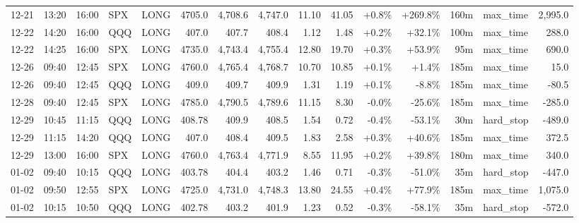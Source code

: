 \documentclass[11pt,a4paper,twoside]{article}
\begin{document}
\begin{landscape}
\begin{center}
\begin{longtable}{>{\color{txtmain}}l l l l l r r r r r r r r >{\color{txtmain}}l r}
12-21 & 13:20 & 16:00 & SPX & LONG & 4705.0 & 4,708.6 & 4,747.0 & 11.10 & 41.05 & \textcolor{wingreen}{+0.8\%} & \textcolor{wingreen}{+269.8\%} & 160m & max\_time & \textcolor{wingreen}{2,995.0} \\
12-22 & 14:20 & 16:00 & QQQ & LONG & 407.0 & 407.7 & 408.4 & 1.12 & 1.48 & \textcolor{wingreen}{+0.2\%} & \textcolor{wingreen}{+32.1\%} & 100m & max\_time & \textcolor{wingreen}{288.0} \\
12-22 & 14:25 & 16:00 & SPX & LONG & 4735.0 & 4,743.4 & 4,755.4 & 12.80 & 19.70 & \textcolor{wingreen}{+0.3\%} & \textcolor{wingreen}{+53.9\%} & 95m & max\_time & \textcolor{wingreen}{690.0} \\
12-26 & 09:40 & 12:45 & SPX & LONG & 4760.0 & 4,765.4 & 4,768.7 & 10.70 & 10.85 & \textcolor{wingreen}{+0.1\%} & \textcolor{wingreen}{+1.4\%} & 185m & max\_time & \textcolor{wingreen}{15.0} \\
12-26 & 09:40 & 12:45 & QQQ & LONG & 409.0 & 409.7 & 409.9 & 1.31 & 1.19 & \textcolor{wingreen}{+0.1\%} & \textcolor{lossred}{-8.8\%} & 185m & max\_time & \textcolor{lossred}{-80.5} \\
12-28 & 09:40 & 12:45 & SPX & LONG & 4785.0 & 4,790.5 & 4,789.6 & 11.15 & 8.30 & \textcolor{lossred}{-0.0\%} & \textcolor{lossred}{-25.6\%} & 185m & max\_time & \textcolor{lossred}{-285.0} \\
12-29 & 10:45 & 11:15 & QQQ & LONG & 408.78 & 409.9 & 408.5 & 1.54 & 0.72 & \textcolor{lossred}{-0.4\%} & \textcolor{lossred}{-53.1\%} & 30m & hard\_stop & \textcolor{lossred}{-489.0} \\
12-29 & 11:15 & 14:20 & QQQ & LONG & 407.0 & 408.4 & 409.5 & 1.83 & 2.58 & \textcolor{wingreen}{+0.3\%} & \textcolor{wingreen}{+40.6\%} & 185m & max\_time & \textcolor{wingreen}{372.5} \\
12-29 & 13:00 & 16:00 & SPX & LONG & 4760.0 & 4,763.4 & 4,771.9 & 8.55 & 11.95 & \textcolor{wingreen}{+0.2\%} & \textcolor{wingreen}{+39.8\%} & 180m & max\_time & \textcolor{wingreen}{340.0} \\
01-02 & 09:40 & 10:15 & QQQ & LONG & 403.78 & 404.4 & 403.2 & 1.46 & 0.71 & \textcolor{lossred}{-0.3\%} & \textcolor{lossred}{-51.0\%} & 35m & hard\_stop & \textcolor{lossred}{-447.0} \\
01-02 & 09:50 & 12:55 & SPX & LONG & 4725.0 & 4,731.0 & 4,748.3 & 13.80 & 24.55 & \textcolor{wingreen}{+0.4\%} & \textcolor{wingreen}{+77.9\%} & 185m & max\_time & \textcolor{wingreen}{1,075.0} \\
01-02 & 10:15 & 10:50 & QQQ & LONG & 402.78 & 403.2 & 401.9 & 1.23 & 0.52 & \textcolor{lossred}{-0.3\%} & \textcolor{lossred}{-58.1\%} & 35m & hard\_stop & \textcolor{lossred}{-572.0} \\

\end{longtable}
\end{center}
\end{landscape}
\end{document}
